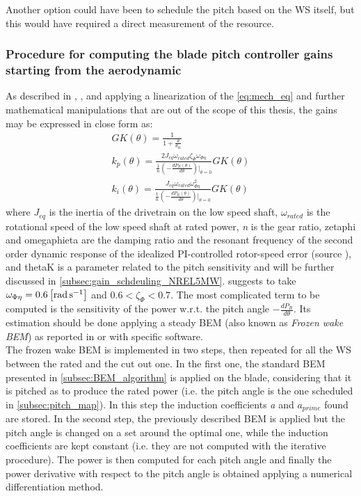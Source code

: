 Another option could have been to schedule the pitch based on the \acrshort{WS} itself, but this would have required a direct measurement of the resource. 

\subsubsection[With scheduling from aerodynamic]{Procedure for computing the blade pitch controller gains starting from the aerodynamic}\label{subsec:gain_schdeuling_aero}
As described in \cite{Aerodynamics_of_wind_turbines}, \cite{NREL_5MW_reference}, and \cite{ris_r_1500} applying a linearization of the \autoref{eq:mech_eq} and further mathematical manipulations that are out of the scope of this thesis,  the gains may be expressed in close form as:
\begin{gather}
    GK(\theta) = \frac{1}{1+\frac{\theta}{\theta_K}} \label{eq:GK}\\
    k_p(\theta) = \frac{2J_{eq}\omega_{rated}\zeta_{\Phi}\omega_{\Phi\eta}}{\frac{1}{n}\left(-\frac{dP_R(\theta)}{d\theta}\right)\vert_{\theta=0}}GK(\theta)
    \label{eq:kp}\\
    k_i(\theta) = \frac{J_{eq}\omega_{rated}\omega_{\Phi\eta}^2}{\frac{1}{n}\left(-\frac{dP_R(\theta)}{d\theta}\right)\vert_{\theta=0}}GK(\theta)
    \label{eq:ki}
\end{gather}
where $J_{eq}$ is the inertia of the drivetrain on the low speed shaft, $\omega_{rated}$ is the rotational speed of the low speed shaft at rated power, \textit{n} is the gear ratio, \acrshort{zetaphi} and \acrshort{omegaphieta} are the damping ratio and the resonant frequency of the second order dynamic response of the idealized PI-controlled rotor-speed error (source \cite{NREL_5MW_reference}), and \acrshort{thetaK} is a parameter related to the pitch sensitivity and will be further discussed in \autoref{subsec:gain_schdeuling_NREL5MW}. \cite{NREL_5MW_reference} suggests to take $\omega_{\Phi\eta}=0.6\left[\si{\radian\per\second}\right]$ and $0.6<\zeta_{\Phi}<0.7$. The most complicated term to be computed is the sensitivity of the power w.r.t. the pitch angle $-\frac{dP_R}{d\theta}$. Its estimation should be done applying a steady \acrshort{BEM} (also known as \textit{Frozen wake BEM}) as reported in \cite{Aerodynamics_of_wind_turbines} or with specific software. \\
The frozen wake BEM is implemented in two steps, then repeated for all the \acrshort{WS} between the rated and the cut out one. In the first one, the standard BEM presented in \autoref{subsec:BEM_algorithm} is applied on the blade, considering that it is pitched as to produce the rated power (i.e. the pitch angle is the one scheduled in \autoref{subsec:pitch_map}). In this step the induction coefficients \textit{a} and \textit{$a_{prime}$} found are stored. In the second step, the previously described BEM is applied but the pitch angle is changed on a set around the optimal one, while the induction coefficients are kept constant (i.e. they are not computed with the iterative procedure). The power is then computed for each pitch angle and finally the power derivative with respect to the pitch angle is obtained applying a numerical differentiation method.

